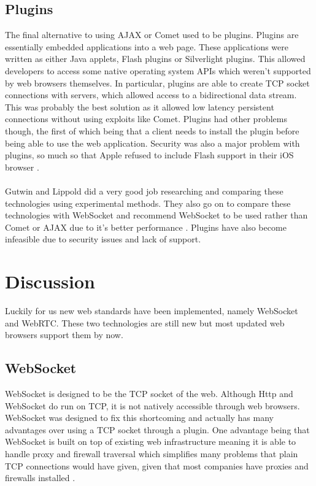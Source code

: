 \documentclass[prodmode,acmtecs]{acmsmall}
\begin{document}
\subsection{Plugins}
The final alternative to using AJAX or Comet used to be plugins. Plugins are essentially embedded applications into a web page. These applications were written as either Java applets, Flash plugins or Silverlight plugins. This allowed developers to access some native operating system APIs which weren't supported by web browsers themselves. In particular, plugins are able to create TCP socket connections with servers, which allowed access to a bidirectional data stream. This was probably the best solution as it allowed low latency persistent connections without using exploits like Comet. Plugins had other problems though, the first of which being that a client needs to install the plugin before being able to use the web application. Security was also a major problem with plugins, so much so that Apple refused to include Flash support in their iOS browser \cite{gutwin2011real}.\\\\

Gutwin and Lippold did a very good job researching and comparing these technologies using experimental methods. They also go on to compare these technologies with WebSocket and recommend WebSocket to be used rather than Comet or AJAX due to it's better performance \cite{gutwin2011real}. Plugins have also become infeasible due to security issues and lack of support. \cite{wenzel2013towards}


\section{Discussion}
Luckily for us new web standards have been implemented, namely WebSocket and WebRTC. These two technologies are still new but most updated web browsers support them by now.

\subsection{WebSocket}
WebSocket is designed to be the TCP socket of the web. Although Http and WebSocket do run on TCP, it is not natively accessible through web browsers. WebSocket was designed to fix this shortcoming and actually has many advantages over using a TCP socket through a plugin. One advantage being that WebSocket is built on top of existing web infrastructure meaning it is able to handle proxy and firewall traversal which simplifies many problems that plain TCP connections would have given, given that most companies have proxies and firewalls installed \cite{wenzel2013towards}.
\end{document}
